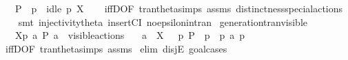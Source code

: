\begin{isabellebody}
\ \ \ {\isacartoucheopen}P{\isacharprime}{\kern0pt}\ {\isacharequal}{\kern0pt}\ {\isasymtheta}{\isacharparenleft}{\kern0pt}p{\isacharparenright}{\kern0pt}\ {\isasymand}\ idle\ p\ X{\isacartoucheclose}\isanewline
%
\isadelimproof
\ \ %
\endisadelimproof
%
\isatagproof
{}\isamarkupfalse%
\ iffD{}{\isacharbrackleft}{\kern0pt}OF\ tran{\isacharunderscore}{\kern0pt}theta{\isachardot}{\kern0pt}simps\ assms{\isacharbrackright}{\kern0pt}\ distinctness{\isacharunderscore}{\kern0pt}special{\isacharunderscore}{\kern0pt}actions\isanewline
\ \ \isamarkupfalse%
\ {\isacharparenleft}{\kern0pt}smt\ injectivity{\isacharunderscore}{\kern0pt}theta{\isacharparenleft}{\kern0pt}{}{\isacharparenright}{\kern0pt}\ insertCI\ no{\isacharunderscore}{\kern0pt}epsilon{\isacharunderscore}{\kern0pt}in{\isacharunderscore}{\kern0pt}tran{\isacharparenleft}{\kern0pt}{}{\isacharparenright}{\kern0pt}{\isacharparenright}{\kern0pt}{\isacharplus}{\kern0pt}%
\endisatagproof
{\isafoldproof}%
%
\isadelimproof
\isanewline
%
\endisadelimproof
\isanewline
{}\isamarkupfalse%
\ generation{\isacharunderscore}{\kern0pt}tran{\isacharunderscore}{\kern0pt}visible{\isacharcolon}{\kern0pt}\isanewline
\ \ \ {\isacartoucheopen}{\isasymtheta}{\isacharbrackleft}{\kern0pt}X{\isacharbrackright}{\kern0pt}{\isacharparenleft}{\kern0pt}p{\isacharparenright}{\kern0pt}\ {\isasymlongmapsto}\isactrlsup {\isasymtheta}a\ P{\isacharprime}{\kern0pt}{\isacartoucheclose}\ {\isacartoucheopen}a\ {\isasymin}\ visible{\isacharunderscore}{\kern0pt}actions{\isacartoucheclose}\isanewline
\ \ \ {\isacartoucheopen}a\ {\isasymin}\ X\ {\isasymand}\ {\isacharparenleft}{\kern0pt}{\isasymexists}\ p{\isacharprime}{\kern0pt}{\isachardot}{\kern0pt}\ P{\isacharprime}{\kern0pt}\ {\isacharequal}{\kern0pt}\ {\isasymtheta}{\isacharparenleft}{\kern0pt}p{\isacharprime}{\kern0pt}{\isacharparenright}{\kern0pt}\ {\isasymand}\ p\ {\isasymlongmapsto}a\ p{\isacharprime}{\kern0pt}{\isacharparenright}{\kern0pt}{\isacartoucheclose}\isanewline
%
\isadelimproof
\ \ %
\endisadelimproof
%
\isatagproof
{}\isamarkupfalse%
\ iffD{}{\isacharbrackleft}{\kern0pt}OF\ tran{\isacharunderscore}{\kern0pt}theta{\isachardot}{\kern0pt}simps\ assms{\isacharparenleft}{\kern0pt}{}{\isacharparenright}{\kern0pt}{\isacharbrackright}{\kern0pt}\isanewline
{}\isamarkupfalse%
\ {\isacharparenleft}{\kern0pt}elim\ disjE{\isacharcomma}{\kern0pt}\ goal{\isacharunderscore}{\kern0pt}cases{\isacharparenright}{\kern0pt}\isanewline

\end{isabellebody}
